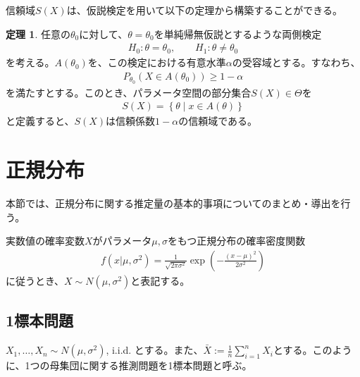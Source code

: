 \documentclass[11pt]{ltjsarticle}
\theoremstyle{definition}
\newtheorem{theorem}{定理}[section]
\begin{document}
信頼域$S(X)$は、仮説検定を用いて以下の定理から構築することができる。
\begin{theorem}\label{th:confidenceregion}
    任意の$\theta_0$に対して、$\theta = \theta_0$を単純帰無仮説とするような両側検定
    \begin{align}
            H_0: \theta=\theta_0,\qquad H_1: \theta\neq \theta_0
    \end{align}
    を考える。$A(\theta_0)$を、この検定における有意水準$\alpha$の受容域とする。すなわち、
    \begin{align}
        P_{\theta_0}(X\in A(\theta_0))\ge 1-\alpha
    \end{align}
    を満たすとする。このとき、パラメータ空間の部分集合$S(X)\in\Theta$を
    \begin{align}
        S(X) = \left\{\theta\mid x\in A(\theta)\right\}
    \end{align}
    と定義すると、$S(X)$は信頼係数$1-\alpha$の信頼域である。
\end{theorem}


\section{正規分布}
本節では、正規分布に関する推定量の基本的事項についてのまとめ・導出を行う。

実数値の確率変数$X$がパラメータ$\mu, \sigma$をもつ正規分布の確率密度関数
\begin{align}
    f(x|\mu, \sigma^2) = \frac{1}{\sqrt{2\pi \sigma^2}}\exp\left(-\frac{(x - \mu)^2}{2\sigma^2}\right)
\end{align}
に従うとき、$X\sim N(\mu, \sigma^2)$と表記する。

\subsection{1標本問題}
$X_1,\ldots,X_n \sim N(\mu, \sigma^2)$, i.i.d. とする。また、$\bar{X} := \frac{1}{n}\sum_{i=1}^n X_i$とする。このように、1つの母集団に関する推測問題を1標本問題と呼ぶ。
\end{document}
